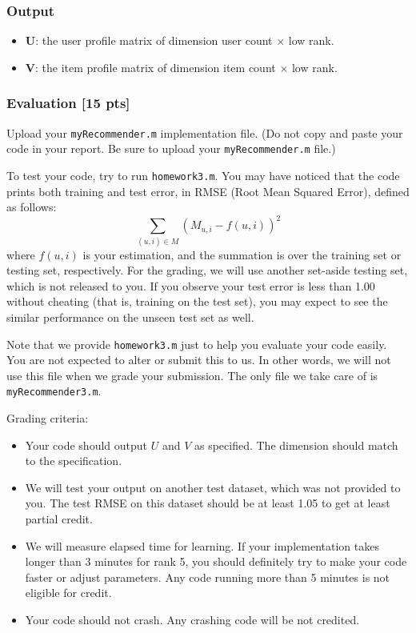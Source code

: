 \documentclass[twoside,10pt]{article}
\begin{document}
\subsubsection*{Output}
\begin{itemize}
  \item \textbf{U}: the user profile matrix of dimension user count
  $\times$ low rank.
  \item \textbf{V}: the item profile matrix of dimension item count
  $\times$ low rank.
\end{itemize}

\subsubsection*{Evaluation [15 pts]}
Upload your \texttt{myRecommender.m} implementation file. (Do not
copy and paste your code in your report. Be sure to upload your
\texttt{myRecommender.m} file.)

To test your code, try to run \texttt{homework3.m}. You may have
noticed that the code prints both training and test error, in RMSE
(Root Mean Squared Error), defined as follows:
\begin{equation}
\sum_{(u,i) \in M} (M_{u,i} - f(u,i))^2 \nonumber
\end{equation}
where $f(u,i)$ is your estimation, and the summation is over the
training set or testing set, respectively. For the grading, we will
use another set-aside testing set, which is not released to you. If
you observe your test error is less than 1.00 without cheating (that
is, training on the test set), you may expect to see the
similar performance on the unseen test set as well.

Note that we provide \texttt{homework3.m} just to help you evaluate your code easily. You are not expected to alter or submit this to us. In other words, we will not use this file when we grade your submission. The only file we take care of is \texttt{myRecommender3.m}.

Grading criteria:
\begin{itemize}
  \item Your code should output $U$ and $V$ as specified. The dimension should match to the specification.
  \item We will test your output on another test dataset, which was not provided to you. The test RMSE on this dataset should be at least 1.05 to get at least partial credit.
  \item We will measure elapsed time for learning. If your implementation takes longer than 3 minutes for rank 5, you should definitely try to make your code faster or adjust parameters. Any code running more than 5 minutes is not eligible for credit.
  \item Your code should not crash. Any crashing code will be not credited.
\end{itemize}
\end{document}
